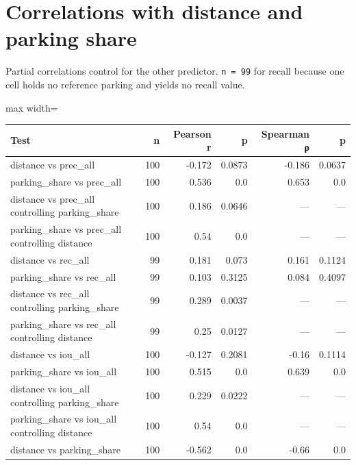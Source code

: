 \hypertarget{correlations-with-distance-and-parking-share}{%
\section{Correlations with distance and parking share}\label{correlations-with-distance-and-parking-share}}

Partial correlations control for the other predictor. \texttt{n\ =\ 99} for recall because one cell holds no reference parking and yields no recall value.

\begin{table}[htbp]
\centering
\begin{adjustbox}{max width=\textwidth}
\begin{tabular}{@{}lrrrrr@{}}
\toprule
Test & n & Pearson r & p & Spearman ρ & p \\
\midrule
distance vs prec\_\allowbreak{}all & 100 & -0.172 & 0.0873 & -0.186 & 0.0637 \\
parking\_\allowbreak{}share vs prec\_\allowbreak{}all & 100 & 0.536 & 0.0 & 0.653 & 0.0 \\
distance vs prec\_\allowbreak{}all \textbar{} controlling parking\_\allowbreak{}share & 100 & 0.186 & 0.0646 & --- & --- \\
parking\_\allowbreak{}share vs prec\_\allowbreak{}all \textbar{} controlling distance & 100 & 0.54 & 0.0 & --- & --- \\
distance vs rec\_\allowbreak{}all & 99 & 0.181 & 0.073 & 0.161 & 0.1124 \\
parking\_\allowbreak{}share vs rec\_\allowbreak{}all & 99 & 0.103 & 0.3125 & 0.084 & 0.4097 \\
distance vs rec\_\allowbreak{}all \textbar{} controlling parking\_\allowbreak{}share & 99 & 0.289 & 0.0037 & --- & --- \\
parking\_\allowbreak{}share vs rec\_\allowbreak{}all \textbar{} controlling distance & 99 & 0.25 & 0.0127 & --- & --- \\
distance vs iou\_\allowbreak{}all & 100 & -0.127 & 0.2081 & -0.16 & 0.1114 \\
parking\_\allowbreak{}share vs iou\_\allowbreak{}all & 100 & 0.515 & 0.0 & 0.639 & 0.0 \\
distance vs iou\_\allowbreak{}all \textbar{} controlling parking\_\allowbreak{}share & 100 & 0.229 & 0.0222 & --- & --- \\
parking\_\allowbreak{}share vs iou\_\allowbreak{}all \textbar{} controlling distance & 100 & 0.54 & 0.0 & --- & --- \\
distance vs parking\_\allowbreak{}share & 100 & -0.562 & 0.0 & -0.66 & 0.0 \\
\bottomrule
\end{tabular}
\end{adjustbox}
\end{table}
\restoreparskip

